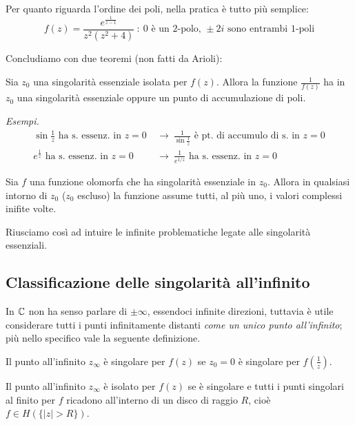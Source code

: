 Per quanto riguarda l'ordine dei poli, nella pratica è tutto più semplice: 
\begin{equation*}
f(z)=\frac{e^{\frac{1}{z-1}}}{z^2(z^2+4)}\ :\ 0\text{ è un 2-polo, }\pm 2i\text{ sono entrambi 1-poli}
\end{equation*}

Concludiamo con due teoremi (non fatti da Arioli):
\begin{thm}
 Sia $z_{0}$ una singolarità essenziale isolata per $f(z)$. Allora la funzione $\frac{1}{f(z)}$ ha in $z_{0}$ una singolarità essenziale oppure un punto di accumulazione di poli.
\end{thm}

\textit{Esempi.}\leavevmode
\begin{align*}
\sin\frac{1}{z}\text{ ha s. essenz. in }z=0 \  &\longrightarrow\ \frac{1}{\sin\frac{1}{z}}\text{ è pt. di accumulo di s. in }z=0 \\
e^{\frac{1}{z}}\text{ ha s. essenz. in }z=0 \  &\longrightarrow\  \frac{1}{e^{1/z}}\text{ ha s. essenz. in }z=0
\end{align*}

\begin{thm}[di Picard]
Sia $f$ una funzione olomorfa che ha singolarità essenziale in $z_0$. Allora in qualsiasi intorno di $z_0$ ($z_0$ escluso) la funzione assume tutti, al più uno, i valori complessi inifite volte.
\end{thm}

Riusciamo così ad intuire le infinite problematiche legate alle singolarità essenziali.

\subsection{Classificazione delle singolarità all'infinito}

In $\mathbb{C}$ non ha senso parlare di $\pm \infty $, essendoci infinite direzioni, tuttavia è utile considerare tutti i punti infinitamente distanti \textit{come un unico punto all'infinito}; più nello specifico vale la seguente definizione.
\begin{defn}
 Il punto all'infinito $z_{\infty}$ è singolare per $f(z)$ se $z_{0} = 0$ è singolare per $f\left(\frac{1}{z}\right)$.
\end{defn}

\begin{defn}
 Il punto all'infinito $z_{\infty}$ è isolato per $f(z)$ se è singolare e tutti i punti singolari al finito per $f$ ricadono all'interno di un disco di raggio $R$, cioè $f\in H(\{|z|>R\})$.
\end{defn}

